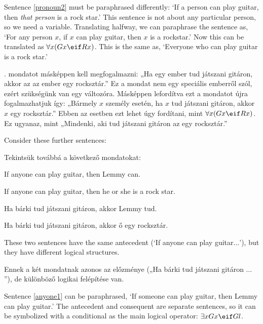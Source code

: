 

Sentence \ref{pronoun2} must be paraphrased differently: `If a person can play guitar, then \emph{that person} is a rock star.' This sentence is not about any particular person, so we need a variable. Translating halfway, we can paraphrase the sentence as, `For any person $x$, if $x$ can play guitar, then $x$ is a rockstar.' Now this can be translated as $\forall x (Gx \eif Rx)$. This is the same as, `Everyone who can play guitar is a rock star.'

. mondatot másképpen kell megfogalmazni: „Ha egy ember tud játszani gitáron, akkor az az ember egy rocksztár.” Ez a mondat nem egy speciális emberről szól, ezért szükségünk van egy változóra. Másképpen lefordítva ezt a mondatot újra fogalmazhatjuk így: „Bármely $x$ személy esetén, ha $x$ tud játszani gitáron, akkor $x$ egy rocksztár.” Ebben az esetben ezt lehet úgy fordítani, mint $\forall x (Gx \eif Rx)$. Ez ugyanaz, mint „Mindenki, aki tud játszani gitáron az egy rocksztár.”


Consider these further sentences:

Tekintsük továbbá a következő mondatokat:


\begin{earg}
\item[\ex{anyone1}] If anyone can play guitar, then Lemmy can.
\item[\ex{anyone2}] If anyone can play guitar, then he or she is a rock star.
\end{earg}

\begin{earg}
\item[\ex{anyone1}] Ha bárki tud játszani gitáron, akkor Lemmy tud.
\item[\ex{anyone2}] Ha bárki tud játszani gitáron, akkor ő egy rocksztár.
\end{earg}

These two sentences have the same antecedent (`If anyone can play guitar$\ldots$'), but they have different logical structures.

Ennek a két mondatnak azonos az előzménye („Ha bárki tud játszani gitáron $\ldots$”), de különböző logikai felépítése van.


Sentence \ref{anyone1} can be paraphrased, `If someone can play guitar, then Lemmy can play guitar.' The antecedent and consequent are separate sentences, so it can be symbolized with a conditional as the main logical operator: $\exists x Gx \eif Gl$.

